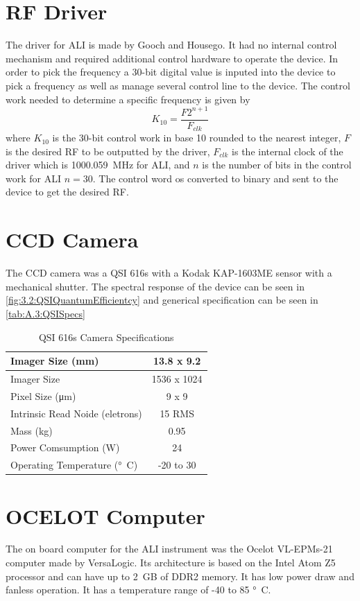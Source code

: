 \section{RF Driver}

The driver for ALI is made by Gooch and Housego. It had no internal control mechanism and required additional control hardware to operate the device. In order to pick the frequency a 30-bit digital value is inputed into the device to pick a frequency as well as manage several control line to the device. The control work needed to determine a specific frequency is given by
\begin{equation}
    K_{10} = \frac{F2^{n+1}}{F_{clk}}
\end{equation}
where $K_{10}$ is the 30-bit control work in base 10 rounded to the nearest integer, $F$ is the desired RF to be outputted by the driver, $F_{clk}$ is the internal clock of the driver which is 1000.059~MHz for ALI, and $n$ is the number of bits in the control work for ALI $n=30$. The control word os converted to binary and sent to the device to get the desired RF.

\section{CCD Camera}

The CCD camera was a QSI 616s with a Kodak KAP-1603ME sensor with a mechanical shutter. The spectral response of the device can be seen in \autoref{fig:3.2:QSIQuantumEfficientcy} and generical specification can be seen in \autoref{tab:A.3:QSISpecs}

\begin{table}
    \begin{center}
    \begin{tabular}{|l|c|}
    \hline
    Imager Size (mm) & 13.8 x 9.2 \\
    \hline
    Imager Size & 1536 x 1024 \\
    \hline
    Pixel Size (\si{\micro\meter}) & 9 x 9 \\
    \hline
    Intrinsic Read Noide (eletrons) & 15 RMS \\
    \hline
    Mass (kg) & 0.95 \\
    \hline
    Power Comsumption (W) & 24 \\
    \hline
    Operating Temperature (\si{\degree C}) & -20 to 30 \\
    \hline
    \end{tabular}
    \end{center}
    \caption[QSI 616s Camera Specifications]{QSI 616s Camera Specifications}
    \label{tab:A.3:QSISpecs}
\end{table}

\section{OCELOT Computer}

The on board computer for the ALI instrument was the Ocelot VL-EPMs-21 computer made by VersaLogic. Its architecture is based on the Intel Atom Z5 processor and can have up to 2~GB of DDR2 memory. It has low power draw and fanless operation. It has a temperature range of -40 to 85 \si{\degree C}.
